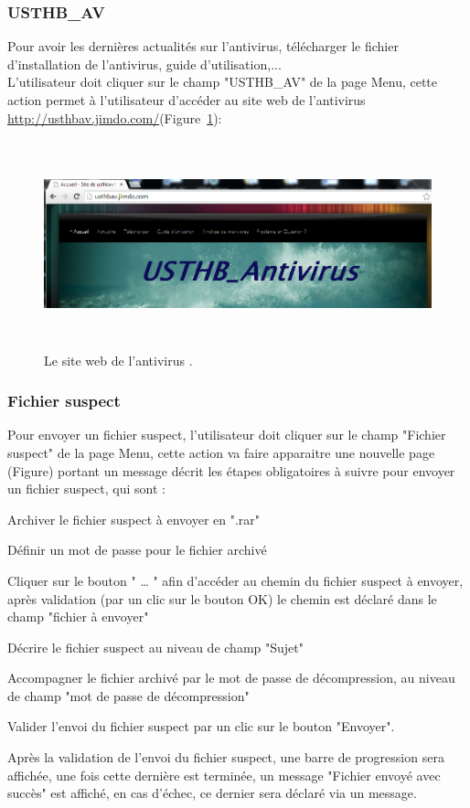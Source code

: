 \subsubsection{USTHB\_AV} 
Pour avoir les dernières actualités sur l'antivirus, télécharger le fichier d'installation de l'antivirus, guide d'utilisation,...\\
L'utilisateur doit cliquer sur le champ "USTHB\_AV" de la page Menu,  cette action permet à l'utilisateur d'accéder au site web de l'antivirus \url{http://usthbav.jimdo.com/}(Figure~\ref{fig :ant2}):
\begin{figure}[H]
\begin{center}
\includegraphics[width=16cm, height=6cm]{Figures/web.png}
\caption{Le site web de l'antivirus .}
\label{fig :ant2} 
\end{center}
\end{figure}
\subsubsection{Fichier suspect}
Pour envoyer un fichier suspect, l'utilisateur doit cliquer sur le champ "Fichier suspect" de la page Menu, cette action va faire apparaitre une nouvelle page (Figure) portant un message décrit les étapes obligatoires à suivre pour envoyer un fichier suspect, qui sont :\\
\begin{list}{•}{}

\item Archiver le fichier suspect à envoyer en ".rar"
\item Définir un mot de passe pour le fichier archivé
\item Cliquer sur le bouton " … "   afin d'accéder au chemin du fichier suspect à envoyer, après validation (par un clic sur le bouton OK) le chemin est déclaré dans le champ "fichier à envoyer"
\item Décrire le fichier suspect au niveau de champ "Sujet" 
\item Accompagner le fichier archivé par le mot de passe de décompression, au niveau de champ "mot de passe de décompression"   
\item Valider l'envoi du fichier suspect par un clic sur le bouton "Envoyer".\\
\end{list}
Après la validation de l'envoi du fichier suspect, une barre de progression sera affichée,  une fois cette dernière est terminée, un message "Fichier envoyé avec succès" est affiché, en cas d'échec, ce dernier sera déclaré via un message.\\

